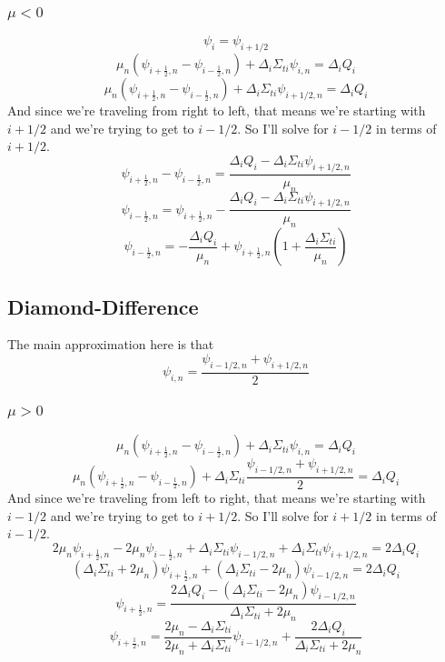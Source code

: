 \documentclass[a4paper]{article}
\begin{document}
 \subsubsection*{$\mu<0$}
 \[\psi_i=\psi_{i+1/2}\]
\[\mu_n\left(\psi_{i+\frac{1}{2},n}-\psi_{i-\frac{1}{2},n}\right)+\Delta_i\Sigma_{ti}\psi_{i,n}=\Delta_iQ_i\]
\[\mu_n\left(\psi_{i+\frac{1}{2},n}-\psi_{i-\frac{1}{2},n}\right)+\Delta_i\Sigma_{ti}\psi_{i+1/2,n}=\Delta_iQ_i\]
And since we're traveling from right to left, that means we're starting with $i+1/2$ and we're trying to get to $i-1/2$. So I'll solve for $i-1/2$ in terms of $i+1/2$.
\[\psi_{i+\frac{1}{2},n}-\psi_{i-\frac{1}{2},n}=\frac{\Delta_iQ_i-\Delta_i\Sigma_{ti}\psi_{i+1/2,n}}{\mu_n}\]
\[\psi_{i-\frac{1}{2},n}=\psi_{i+\frac{1}{2},n}-\frac{\Delta_iQ_i-\Delta_i\Sigma_{ti}\psi_{i+1/2,n}}{\mu_n}\]
\[\boxed{\psi_{i-\frac{1}{2},n}=-\frac{\Delta_iQ_i}{\mu_n}+\psi_{i+\frac{1}{2},n}\left(1+\frac{\Delta_i\Sigma_{ti}}{\mu_n}\right)}\]





 \subsection*{Diamond-Difference}
 The main approximation here is that 
 \[\psi_{i,n}=\frac{\psi_{i-1/2,n}+\psi_{i+1/2,n}}{2}\]

 \subsubsection*{$\mu>0$}
\[\mu_n\left(\psi_{i+\frac{1}{2},n}-\psi_{i-\frac{1}{2},n}\right)+\Delta_i\Sigma_{ti}\psi_{i,n}=\Delta_iQ_i\]
\[\mu_n\left(\psi_{i+\frac{1}{2},n}-\psi_{i-\frac{1}{2},n}\right)+\Delta_i\Sigma_{ti}\frac{\psi_{i-1/2,n}+\psi_{i+1/2,n}}{2}=\Delta_iQ_i\]
And since we're traveling from left to right, that means we're starting with $i-1/2$ and we're trying to get to $i+1/2$. So I'll solve for $i+1/2$ in terms of $i-1/2$.
\[2\mu_n\psi_{i+\frac{1}{2},n}-2\mu_n\psi_{i-\frac{1}{2},n}+\Delta_i\Sigma_{ti}\psi_{i-1/2,n}+\Delta_i\Sigma_{ti}\psi_{i+1/2,n}=2\Delta_iQ_i\]
\[(\Delta_i\Sigma_{ti}+2\mu_n)\psi_{i+\frac{1}{2},n}+(\Delta_i\Sigma_{ti}-2\mu_n)\psi_{i-1/2,n}=2\Delta_iQ_i\]
\[\psi_{i+\frac{1}{2},n}=\frac{2\Delta_iQ_i-(\Delta_i\Sigma_{ti}-2\mu_n)\psi_{i-1/2,n}}{\Delta_i\Sigma_{ti}+2\mu_n}\]
\[\boxed{\psi_{i+\frac{1}{2},n}=\frac{2\mu_n-\Delta_i\Sigma_{ti}}{2\mu_n+\Delta_i\Sigma_{ti}}\psi_{i-1/2,n}+\frac{2\Delta_iQ_i}{\Delta_i\Sigma_{ti}+2\mu_n}}\]
\end{document}
